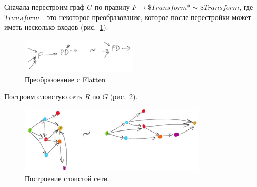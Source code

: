 \begin{algo}
Сначала перестроим граф $G$ по правилу $F \xrightarrow{} \$Transform* \sim \$Transform$, где $Transform$ - это некоторое преобразование, которое после перестройки может иметь несколько входов (рис.~\ref{fig:flatten}).\\
\begin{figure}[h]
    \centering
    \includegraphics[width=0.5\textwidth]{img/flatten.jpeg}
    \caption{Преобразование с Flatten}
    \label{fig:flatten}
\end{figure}

Построим слоистую сеть $R$ по $G$ (рис.~\ref{fig:net}).\\
\begin{figure}[h]
    \centering
    \includegraphics[width=0.8\textwidth]{img/net.jpeg}
    \caption{Построение слоистой сети}
    \label{fig:net}
\end{figure}


\end{algo}
